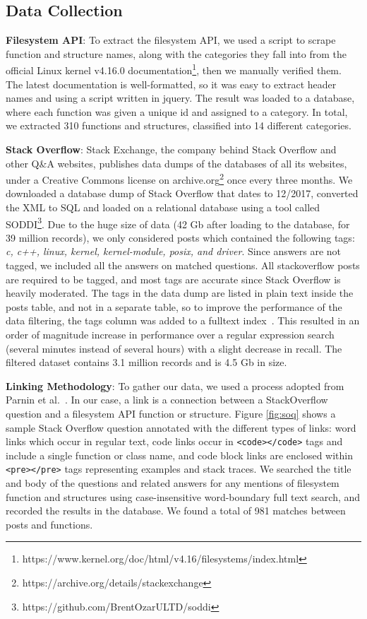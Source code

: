 \subsection{Data Collection}\label{subsec:data}
\textbf{Filesystem API}: To extract the filesystem API, we used a script to scrape function and structure names, along with the categories they fall into from the official Linux kernel v4.16.0 documentation\footnote{https://www.kernel.org/doc/html/v4.16/filesystems/index.html}, then we manually verified them. The latest documentation is well-formatted, so it was easy to extract header names and using a script written in jquery. The result was loaded to a database, where each function was given a unique id and assigned to a category. In total, we extracted 310 functions and structures, classified into 14 different categories.

\textbf{Stack Overflow}: Stack Exchange, the company behind Stack Overflow and other Q\&A websites, publishes data dumps of the databases of all its websites, under a Creative Commons license on archive.org\footnote{https://archive.org/details/stackexchange} once every three months. We downloaded a database dump of Stack Overflow that dates to 12/2017, converted the XML to SQL and loaded on a relational database using a tool called SODDI\footnote{https://github.com/BrentOzarULTD/soddi}. Due to the huge size of data (42 Gb after loading to the database, for 39 million records), we only considered posts which contained the following tags: \textit{c, c++, linux, kernel, kernel-module, posix, and driver}. Since answers are not tagged, we included all the answers on matched questions. All stackoverflow posts are required to be tagged, and most tags are accurate since Stack Overflow is heavily moderated. The tags in the data dump are listed in plain text inside the posts table, and not in a separate table, so to improve the performance of the data filtering, the tags column was added to a fulltext index~\cite{Hamilton2001}. This resulted in an order of magnitude increase in performance over a regular expression search (several minutes instead of several hours) with a slight decrease in recall. The filtered dataset contains 3.1 million records and is 4.5 Gb in size.

\textbf{Linking Methodology}: To gather our data, we used a process adopted from Parnin et al.~\cite{Parnin2012CrowdDE}.
In our case, a link is a connection between a StackOverflow question and a filesystem API function or structure. Figure \ref{fig:soq} shows a sample Stack Overflow question annotated with the different types of links: word links which occur in regular text, code links occur in \texttt{<code></code>} tags and include a single function or class name, and code block links are enclosed within \texttt{<pre></pre>} tags representing examples and stack traces. We searched the title and body of the questions and related answers for any mentions of filesystem function and structures using case-insensitive word-boundary full text search, and recorded the results in the database. We found a total of 981 matches between posts and functions.

